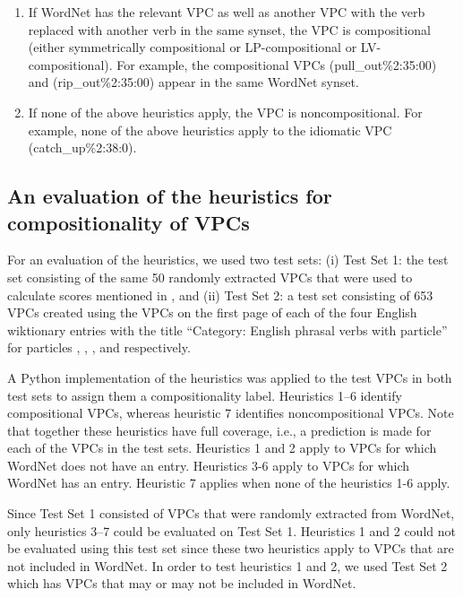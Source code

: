 \documentclass[output=paper,modfonts,nonflat]{langsci/langscibook}
\begin{document}
\begin{enumerate}
\item If WordNet has the relevant VPC as well as another VPC with the verb replaced with another verb in the same synset, the VPC is compositional (either symmetrically compositional or LP-compositional or LV-compositional). For example, the compositional VPCs  (pull\_out\%2:35:00) and  (rip\_out\%2:35:00) appear in the same WordNet synset.

\fussy
\newpage 
\item If none of the above heuristics apply, the VPC is noncompositional. For example, none of the above heuristics apply to the idiomatic VPC  (catch\_up\%2:38:0).

\end{enumerate}


\subsection{An evaluation of the heuristics for compositionality of VPCs} \label{sec:eval}

For an evaluation of the heuristics, we used two test sets: (i) Test Set 1: the test set consisting of the same 50 randomly extracted VPCs that were used to calculate  scores mentioned in , and (ii) Test Set 2: a test set consisting of 653 VPCs created using the VPCs on the first page of each of the four English wiktionary entries with the title ``Category: English phrasal verbs with particle'' for particles , , , and  respectively.

A Python implementation of the heuristics was applied to the test VPCs in both test sets to assign them a compositionality label. Heuristics 1--6 identify compositional VPCs, whereas heuristic 7 identifies noncompositional VPCs. Note that together these heuristics have full coverage, i.e., a prediction is made for each of the VPCs in the test sets. Heuristics 1 and 2 apply to VPCs for which WordNet does not have an entry.  Heuristics 3-6 apply to VPCs for which WordNet has an entry. Heuristic 7 applies when none of the heuristics 1-6 apply.

Since Test Set 1 consisted of VPCs that were randomly extracted from WordNet, only heuristics 3--7 could be evaluated on Test Set 1. Heuristics 1 and 2 could not be evaluated using this test set since these two heuristics apply to VPCs that are not included in WordNet. In order to test heuristics 1 and 2, we used Test Set 2 which has VPCs that may or may not be included in WordNet. 
\end{document}
